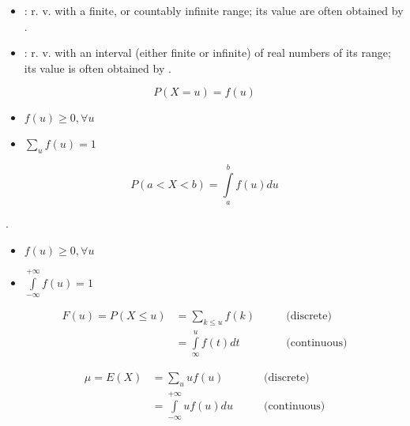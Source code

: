 \begin{multicols*}{3}


    \begin{itemize}[noitemsep]
      \item {}: r. v. with a finite, or countably infinite range; its value are often obtained by .
      \item {}: r. v. with an interval (either finite or infinite) of real numbers of its range; its value is often obtained by .
    \end{itemize}

      \[
        P(X = u) = f(u)
      \]

      \begin{itemize}
        \item $f(u) \geq 0, \forall u$
        \item $\sum\limits_{u} f(u) = 1$
      \end{itemize}

      \[
        P(a < X < b) = \int\limits_{a}^{b} f(u)du
      \]
      \par {}.

      \begin{itemize}
        \item $f(u) \geq 0, \forall u$
        \item $\int\limits_{-\infty}^{+\infty} f(u) = 1$
      \end{itemize}

      \begin{align*}
        F(u) = P(X \leq u) &= \sum\limits_{k \leq u} f(k) & \qquad \text{(discrete)}\\
                           &= \int\limits_{\infty}^{u} f(t)dt & \qquad \text{(continuous)}
      \end{align*}

      \begin{align*}
        \mu = E(X) &= \sum\limits_{u} uf(u) & \qquad \text{(discrete)}\\
             &= \int\limits_{-\infty}^{+\infty} uf(u)du & \qquad \text{(continuous)}
      \end{align*}


\end{multicols*}
